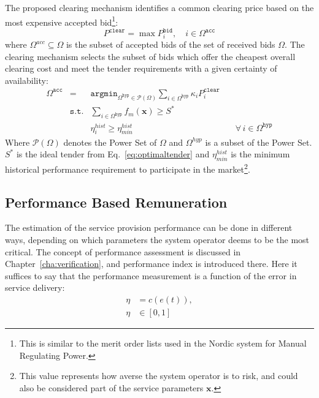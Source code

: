 The proposed clearing mechanism identifies a common clearing price based on the most expensive accepted bid\footnote{This is similar to the merit order lists used in \eg the Nordic system for Manual Regulating Power\cite{bondy2013}.}:
\begin{equation}
    P^\mathtt{clear} = \max P^\mathtt{bid}_i, \quad i \in \Omega^\mathtt{acc}
\end{equation}
where $\Omega^{acc}\subseteq \Omega$ is the subset of accepted bids of the set of received bids $\Omega$. 
The clearing mechanism selects the subset of bids which offer the cheapest overall clearing cost and meet the tender requirements with a given certainty of availability: 
\begin{align}
      \Omega^\mathtt{acc} &= &\mathtt{argmin}_{\Omega^\mathtt{hyp} \in \mathcal P(\Omega)} \sum_{i\in \Omega^\mathtt{hyp}}{\kappa_i P^\mathtt{clear}_i } & \\
	  &\mathtt{s.t.}& \sum_{i\in \Omega^\mathtt{hyp}} f_m(\mathbf{x}) \geq S^* &  \\
      &~ & \eta^{hist}_i \geq \eta^{hist}_{min} &\quad \forall \, i \in \Omega^\mathtt{hyp} 
\end{align}
Where $\mathcal P(\Omega)$ denotes the Power Set of $\Omega$ and $\Omega^{hyp}$ is a subset of the Power Set. $S^*$ is the ideal tender from Eq.~\eqref{eq:optimaltender} and $\eta^{hist}_{min}$ is the minimum historical performance requirement to participate in the market\footnote{This value represents how averse the system operator is to risk, and could also be considered part of the service parameters $\textbf{x}$.}.


\subsection{Performance Based Remuneration} %
\label{sub:PerformanceBasedRemuneration}

The estimation of the service provision performance can be done in different ways, depending on which parameters the system operator deems to be the most critical. The concept of performance assessment is discussed in Chapter~\ref{cha:verification}, and performance index is introduced there. Here it suffices to say that the performance measurement is a function of the error in service delivery:
\begin{align}
	\eta &= c(e(t)), \label{eq:perfindexsimple}\\
	\eta &\in [0,1]
\end{align}

